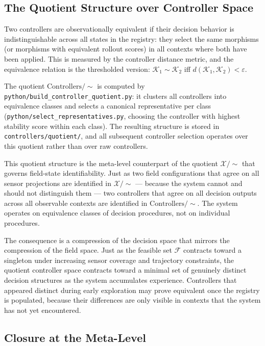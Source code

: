 \documentclass[11pt, oneside]{article}
\newcommand{\Xmod}{\mathcal{X}/{\sim}}
\begin{document}
\subsection{The Quotient Structure over Controller Space}

Two controllers are observationally equivalent if their decision behavior is
indistinguishable across all states in the registry: they select the same morphisms
(or morphisms with equivalent rollout scores) in all contexts where both have been
applied. This is measured by the controller distance metric, and the equivalence
relation is the thresholded version: $\mathcal{K}_1 \sim \mathcal{K}_2$ iff
$d(\mathcal{K}_1, \mathcal{K}_2) < \varepsilon$.

The quotient $\mathrm{Controllers}/{\sim}$ is computed by
\texttt{python/build\_controller\_quotient.py}: it clusters all controllers into
equivalence classes and selects a canonical representative per class
(\texttt{python/select\_representatives.py}, choosing the controller with highest
stability score within each class). The resulting structure is stored in
\texttt{controllers/quotient/}, and all subsequent controller selection operates over
this quotient rather than over raw controllers.

This quotient structure is the meta-level counterpart of the quotient $\Xmod$ that
governs field-state identifiability. Just as two field configurations that agree on all
sensor projections are identified in $\Xmod$ --- because the system cannot and should not
distinguish them --- two controllers that agree on all decision outputs across all
observable contexts are identified in $\mathrm{Controllers}/{\sim}$. The system operates
on equivalence classes of decision procedures, not on individual procedures.

The consequence is a compression of the decision space that mirrors the compression of
the field space. Just as the feasible set $\mathcal{F}$ contracts toward a singleton
under increasing sensor coverage and trajectory constraints, the quotient controller
space contracts toward a minimal set of genuinely distinct decision structures as the
system accumulates experience. Controllers that appeared distinct during early exploration
may prove equivalent once the registry is populated, because their differences are only
visible in contexts that the system has not yet encountered.

\subsection{Closure at the Meta-Level}
\end{document}
